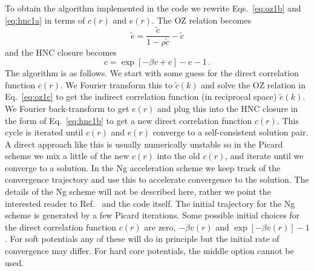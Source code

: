 \documentclass[12pt,a4paper]{article}
\newcommand{\Eqref}[1]{Eq.~\eqref{#1}}
\newcommand{\Eqsref}[1]{Eqs.~\eqref{#1}}
\newcommand{\Refcite}[1]{Ref.~\cite{#1}}
\begin{document}
To obtain the algorithm implemented in the code we rewrite
\Eqsref{eq:oz1b} and \eqref{eq:hnc1a} in terms of $c(r)$ and
$e(r)$.  The OZ relation becomes
%
\begin{equation}
\tilde e = \frac{\tilde c}{1-\rho\tilde c}-\tilde c
\label{eq:oz1c}
\end{equation}
%
and the HNC closure becomes
%
\begin{equation}
c=\exp[{-\beta v}+e]-e-1\,.
\label{eq:hnc1b}
\end{equation}
%
The algorithm is as follows.  We start with some guess for the direct
correlation function $c(r)$.  We Fourier transform this to $\tilde
c(k)$ and solve the OZ relation in \Eqref{eq:oz1c} to get the indirect
correlation function (in reciprocal space) $\tilde e(k)$.  We Fourier
back-transform to get $e(r)$ and plug this into the HNC closure in the
form of \Eqref{eq:hnc1b} to get a new direct correlation function
$c(r)$.  This cycle is iterated until $c(r)$ and $e(r)$ converge to a
self-consistent solution pair.  A direct approach like this is usually
numerically unstable so in the Picard scheme we mix a little of the
new $c(r)$ into the old $c(r)$, and iterate until we converge to a
solution.  In the Ng acceleration scheme we keep track of the
convergence trajectory and use this to accelerate convergence to the
solution.  The details of the Ng scheme will not be described here,
rather we point the interested reader to \Refcite{Ng74} and the code
itself.  The initial trajectory for the Ng scheme is generated by a
few Picard iterations.  Some possible initial choices for the direct
correlation function $c(r)$ are zero, $-\beta v(r)$ and $\exp[-\beta
  v(r)]-1$.  For soft potentials any of these will do in principle but
the initial rate of convergence may differ.  For hard core potentials,
the middle option cannot be used.
 
\end{document}
